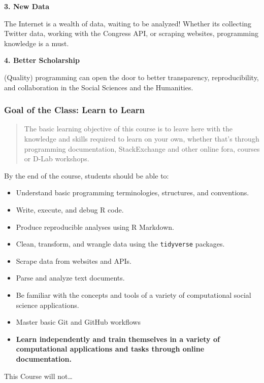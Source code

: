 \documentclass[]{book}
\providecommand{\tightlist}{%
  \setlength{\itemsep}{0pt}\setlength{\parskip}{0pt}}
\begin{document}
\textbf{3. New Data}

The Internet is a wealth of data, waiting to be analyzed! Whether its
collecting Twitter data, working with the Congress API, or scraping
websites, programming knowledge is a must.

\textbf{4. Better Scholarship}

(Quality) programming can open the door to better transparency,
reproducibility, and collaboration in the Social Sciences and the
Humanities.

\subsubsection*{Goal of the Class: Learn to
Learn}\label{goal-of-the-class-learn-to-learn}

\begin{quote}
The basic learning objective of this course is to leave here with the
knowledge and skills required to learn on your own, whether that's
through programming documentation, StackExchange and other online fora,
courses or D-Lab workshops.
\end{quote}

By the end of the course, students should be able to:

\begin{itemize}
\tightlist
\item
  Understand basic programming terminologies, structures, and
  conventions.
\item
  Write, execute, and debug R code.
\item
  Produce reproducible analyses using R Markdown.
\item
  Clean, transform, and wrangle data using the \texttt{tidyverse}
  packages.
\item
  Scrape data from websites and APIs.
\item
  Parse and analyze text documents.
\item
  Be familiar with the concepts and tools of a variety of computational
  social science applications.
\item
  Master basic Git and GitHub workflows
\item
  \textbf{Learn independently and train themselves in a variety of
  computational applications and tasks through online documentation.}
\end{itemize}

This Course will not\ldots{}
\end{document}
